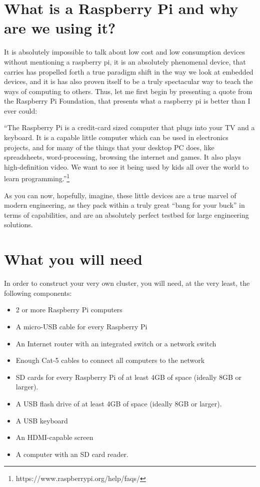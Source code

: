 \documentclass[]{article}
\begin{document}
    \newpage
    \tableofcontents

    \newpage
    \section{What is a Raspberry Pi and why are we using it?}
    It is absolutely impossible to talk about low cost and low consumption devices without
    mentioning a raspberry pi, it is an absolutely phenomenal device, that carries has propelled
    forth a true paradigm shift in the way we look at embedded devices, and it is has also proven
    itself to be a truly spectacular way to teach the ways of computing to others. Thus, let me first begin by 
    presenting a quote from the Raspberry Pi Foundation, that presents what a 
    raspberry pi is better than I ever could:
    \begin{displayquote}
    ``The Raspberry Pi is a credit-card sized computer that plugs into your TV and a keyboard. It is a capable 
    little computer which can be used in electronics projects, and for many of the things that your desktop PC 
    does, like spreadsheets, word-processing, browsing the internet and games. It also plays high-definition 
    video. We want to see it being used by kids all over the world to learn 
    programming.''\footnote{https://www.raspberrypi.org/help/faqs/}
    \end{displayquote}

    As you can now, hopefully, imagine, these little devices are a true marvel of modern engineering,
    as they pack within a truly great ``bang for your buck'' in terms of capabilities, and are an 
    absolutely perfect testbed for large engineering solutions.
    \section{What you will need}
    In order to construct  your very own cluster, you will need, at the very least, the following components:
    \begin{itemize}
        \item 2 or more Raspberry Pi computers
            \item A micro-USB cable for every Raspberry Pi
                \item An Internet router with an integrated switch or a network switch
                    \item Enough Cat-5 cables to connect all computers to the network
                        \item SD cards for every Raspberry Pi of at least 4GB of space (ideally 8GB or larger).
                            \item A USB flash drive of at least 4GB of space (ideally 8GB or larger).
                                \item A USB keyboard
                                    \item An HDMI-capable screen
                                        \item A computer with an SD card reader.
                                        \end{itemize}
\end{document}
